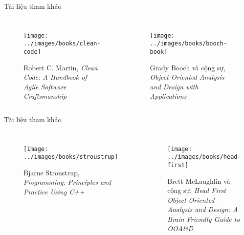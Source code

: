\documentclass{beamer}
\begin{document}
\begin{frame}{Tài liệu tham khảo}
    \begin{columns}
        \begin{figure}
            \centering
            \texttt{[image: ../images/books/clean-code]}
            \caption{Robert C. Martin, \emph{Clean Code: A Handbook of Agile Software Craftsmanship}}
        \end{figure}
        \begin{figure}
            \centering
            \texttt{[image: ../images/books/booch-book]}
            \caption{Grady Booch và cộng sự,
            \emph{Object-Oriented Analysis and Design with Applications}}
        \end{figure}
    \end{columns}
\end{frame}

\begin{frame}{Tài liệu tham khảo}
    \begin{columns}
        \begin{figure}
            \centering
            \texttt{[image: ../images/books/stroustrup]}
            \caption{Bjarne Stroustrup, \emph{Programming: Principles and Practice Using C++}}
        \end{figure}
        \begin{figure}
            \centering
            \texttt{[image: ../images/books/head-first]}
            \caption{Brett McLaughlin và cộng sự, \emph{Head First Object-Oriented Analysis and Design: A Brain Friendly Guide to OOA\&D}}
        \end{figure}
    \end{columns}
\end{frame}
\end{document}
